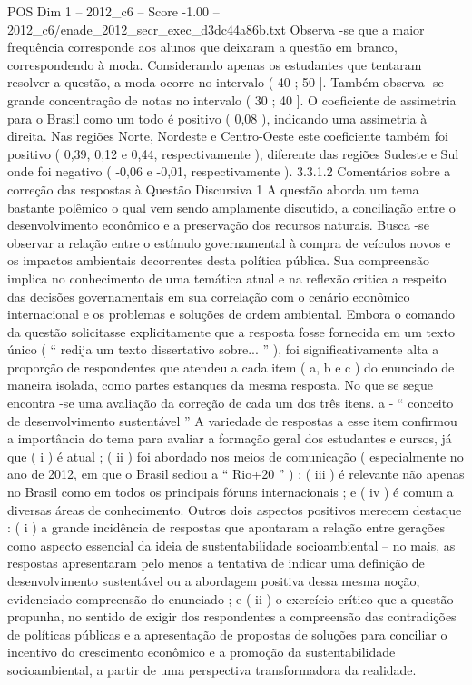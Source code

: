 \begin{textsample}{POS Dim 1 – 2012\_c6 – Score -1.00 – 2012\_c6/enade\_2012\_secr\_exec\_d3dc44a86b.txt}
Observa -se que a maior frequência corresponde aos alunos que deixaram a questão em branco, correspondendo à moda.
Considerando apenas os estudantes que tentaram resolver a questão, a moda ocorre no intervalo ( 40 ; 50 ].
Também observa -se grande concentração de notas no intervalo ( 30 ; 40 ].
O coeficiente de assimetria para o Brasil como um todo é positivo ( 0,08 ), indicando uma assimetria à direita.
Nas regiões Norte, Nordeste e Centro-Oeste este coeficiente também foi positivo ( 0,39, 0,12 e 0,44, respectivamente ), diferente das regiões Sudeste e Sul onde foi negativo ( -0,06 e -0,01, respectivamente ). 3.3.1.2 Comentários sobre a correção das respostas à Questão Discursiva 1 A questão aborda um tema bastante polêmico o qual vem sendo amplamente discutido, a conciliação entre o desenvolvimento econômico e a preservação dos recursos naturais.
Busca -se observar a relação entre o estímulo governamental à compra de veículos novos e os impactos ambientais decorrentes desta política pública.
Sua compreensão implica no conhecimento de uma temática atual e na reflexão critica a respeito das decisões governamentais em sua correlação com o cenário econômico internacional e os problemas e soluções de ordem ambiental.
Embora o comando da questão solicitasse explicitamente que a resposta fosse fornecida em um texto único ( “ redija um texto dissertativo sobre... ” ), foi significativamente alta a proporção de respondentes que atendeu a cada item ( a, b e c ) do enunciado de maneira isolada, como partes estanques da mesma resposta.
No que se segue encontra -se uma avaliação da correção de cada um dos três itens. a - “ conceito de desenvolvimento sustentável ” A variedade de respostas a esse item confirmou a importância do tema para avaliar a formação geral dos estudantes e cursos, já que ( i ) é atual ; ( ii ) foi abordado nos meios de comunicação ( especialmente no ano de 2012, em que o Brasil sediou a “ Rio+20 ” ) ; ( iii ) é relevante não apenas no Brasil como em todos os principais fóruns internacionais ; e ( iv ) é comum a diversas áreas de conhecimento.
Outros dois aspectos positivos merecem destaque : ( i ) a grande incidência de respostas que apontaram a relação entre gerações como aspecto essencial da ideia de sustentabilidade socioambiental – no mais, as respostas apresentaram pelo menos a tentativa de indicar uma definição de desenvolvimento sustentável ou a abordagem positiva dessa mesma noção, evidenciado compreensão do enunciado ; e ( ii ) o exercício crítico que a questão propunha, no sentido de exigir dos respondentes a compreensão das contradições de políticas públicas e a apresentação de propostas de soluções para conciliar o incentivo do crescimento econômico e a promoção da sustentabilidade socioambiental, a partir de uma perspectiva transformadora da realidade.

\end{textsample}
